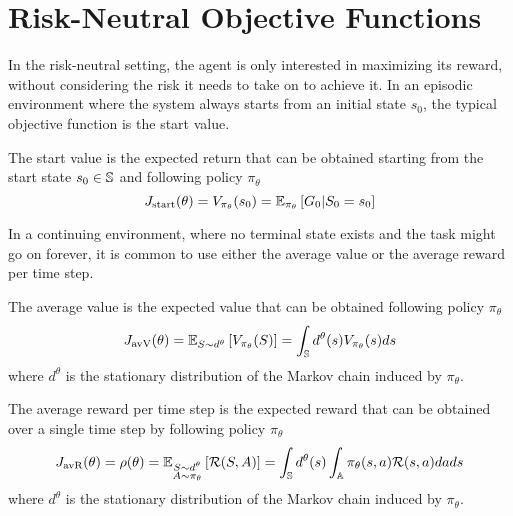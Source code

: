 \section{Risk-Neutral Objective Functions}
In the risk-neutral setting, the agent is only interested in maximizing its reward, without considering the risk it needs to take on to achieve it. In an episodic environment where the system always starts from an initial state $s_0$, the typical objective function is the start value.
\begin{definition}
	The start value is the expected return that can be obtained starting from the start state $s_0 \in \S$ and following policy $\pi_\theta$
	\begin{equation}
		J_{\text{start}}(\theta) = V_{\pi_\theta}(s_0) = \E[\pi_\theta]{G_0 |
		   S_0 = s_0}
	\end{equation}
\end{definition}
In a continuing environment, where no terminal state exists and the task might go on forever, it is common to use either the average value or the average reward per time step.
\begin{definition}
	The average value is the expected value that can be obtained following policy $\pi_\theta$ 
	\begin{equation}
		J_{\text{avV}}(\theta) = \E[S \sim d^{\theta}]{V_{\pi_\theta}(S)} = \int_\S
		d^{\theta}(s) V_{\pi_\theta}(s) ds
	\end{equation}
	where $d^\theta$ is the stationary distribution of the Markov chain induced by $\pi_\theta$.	
\end{definition}
\begin{definition}
	The average reward per time step is the expected reward that can be
	obtained over a single time step by following policy $\pi_\theta$ 
	\begin{equation}
		J_{\text{avR}}(\theta) = \rho(\theta) = \E[\substack{S \sim d^{\theta}\\A \sim \pi_\theta}]{\calR(S,A)} 
		= \int_\S d^{\theta}(s) \int_\A \pi_\theta(s,a) \calR(s,a) da ds
	\end{equation}
	where $d^\theta$ is the stationary distribution of the Markov chain induced by $\pi_\theta$.
\end{definition}

